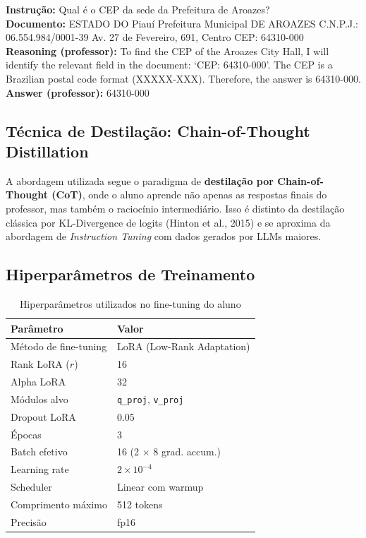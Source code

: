 \documentclass[12pt, a4paper]{article}
\begin{document}
\begin{exemplobox}
\textbf{Instrução:} Qual é o CEP da sede da Prefeitura de Aroazes?\\[0.3em]
\textbf{Documento:} ESTADO DO Piauí Prefeitura Municipal DE AROAZES C.N.P.J.:
06.554.984/0001-39 Av. 27 de Fevereiro, 691, Centro CEP: 64310-000\\[0.3em]
\textbf{Reasoning (professor):} To find the CEP of the Aroazes City Hall, I will
identify the relevant field in the document: `CEP: 64310-000'. The CEP is a
Brazilian postal code format (XXXXX-XXX). Therefore, the answer is 64310-000.\\[0.3em]
\textbf{Answer (professor):} 64310-000
\end{exemplobox}

\subsection{Técnica de Destilação: Chain-of-Thought Distillation}

A abordagem utilizada segue o paradigma de \textbf{destilação por Chain-of-Thought
(CoT)}, onde o aluno aprende não apenas as respostas finais do professor, mas também
o raciocínio intermediário. Isso é distinto da destilação clássica por KL-Divergence
de logits (Hinton et al., 2015) e se aproxima da abordagem de \textit{Instruction
Tuning} com dados gerados por LLMs maiores.

\subsection{Hiperparâmetros de Treinamento}

\begin{table}[H]
\centering
\caption{Hiperparâmetros utilizados no fine-tuning do aluno}
\begin{tabular}{ll}
\toprule
\textbf{Parâmetro} & \textbf{Valor} \\
\midrule
Método de fine-tuning   & LoRA (Low-Rank Adaptation) \\
Rank LoRA ($r$)         & 16 \\
Alpha LoRA              & 32 \\
Módulos alvo            & \texttt{q\_proj}, \texttt{v\_proj} \\
Dropout LoRA            & 0.05 \\
Épocas                  & 3 \\
Batch efetivo           & 16 (2 $\times$ 8 grad. accum.) \\
Learning rate           & $2 \times 10^{-4}$ \\
Scheduler               & Linear com warmup \\
Comprimento máximo      & 512 tokens \\
Precisão                & fp16 \\
\bottomrule
\end{tabular}
\end{table}
\end{document}
